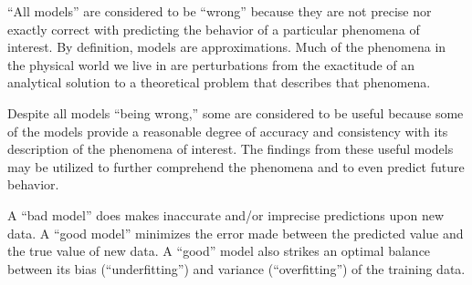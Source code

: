 \documentclass[12pt]{article}
\begin{document}
\begin{enumerate}
\begin{tcolorbox}[colback=white, sharp corners]
\end{tcolorbox}


\begin{tcolorbox}[colback=white, sharp corners]

``All models'' are considered to be ``wrong'' because they are not precise nor exactly correct with predicting the behavior of a particular phenomena of interest. By definition, models are approximations. Much of the phenomena in the physical world we live in are perturbations from the exactitude of an analytical solution to a theoretical problem that describes that phenomena. 

\end{tcolorbox}


\begin{tcolorbox}[colback=white, sharp corners]

Despite all models ``being wrong,'' some are considered to be useful because some of the models provide a reasonable degree of accuracy and consistency with its description of the phenomena of interest. The findings from these useful models may be utilized to further comprehend the phenomena and to even predict future behavior. 

\end{tcolorbox}


\begin{tcolorbox}[colback=white, sharp corners]

A ``bad model'' does makes inaccurate and/or imprecise predictions upon new data. A ``good model'' minimizes the error made between the predicted value and the true value of new data. A ``good'' model also strikes an optimal balance between its bias (``underfitting'') and variance (``overfitting'') of the training data.

\end{tcolorbox}

\end{enumerate}
\end{document}
